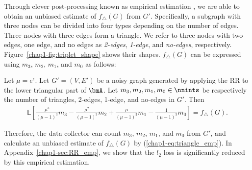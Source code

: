 Through 
clever post-processing 
known as 
empirical estimation 
\cite{Kairouz_ICML16,Murakami_USENIX19,Wang_USENIX17},
we are able to obtain an unbiased estimate of $f_\triangle(G)$ 
from $G'$. 
Specifically, a subgraph with three nodes can be divided into four types depending on the number of edges. 
Three nodes with three edges form a triangle. 
We refer to three nodes with two edges, one edge, and no edges as \textit{2-edges},  \textit{1-edge}, and  \textit{no-edges}, respectively. 
Figure~\ref{chap1-fig:triplet_shape} shows their shapes. 
$f_\triangle(G)$ can be expressed using $m_3$, $m_2$, $m_1$, and $m_0$ as follows:

\begin{proposition}\label{chap1-prop:triangle_emp}
  Let $\mu = e^\epsilon$. 
  Let $G'=(V,E')$ be a noisy graph generated by applying the RR to the lower triangular part of $\bmA$.
  Let $m_3, m_2, m_1, m_0 \in \nnints$ be respectively the number of triangles, 2-edges, 1-edge, and no-edges in $G'$. 
  Then 
  \begin{align}
      \textstyle{\mathbb{E}\left[ \frac{\mu^3}{(\mu-1)^3} m_3 - \frac{\mu^2}{(\mu-1)^3} m_2 + \frac{\mu}{(\mu-1)^3} m_1 - \frac{1}{(\mu-1)^3} m_0 \right] = f_\triangle(G).}
      \label{chap1-eq:triangle_emp}
  \end{align}
\end{proposition}

Therefore, the data collector can count $m_3$, $m_2$, $m_1$, and $m_0$ from $G'$, and calculate an unbiased estimate of $f_\triangle(G)$ by (\ref{chap1-eq:triangle_emp}). 
In Appendix~\ref{chap1-sec:RR_emp}, we show that the $l_2$ loss is significantly reduced by this empirical estimation.

